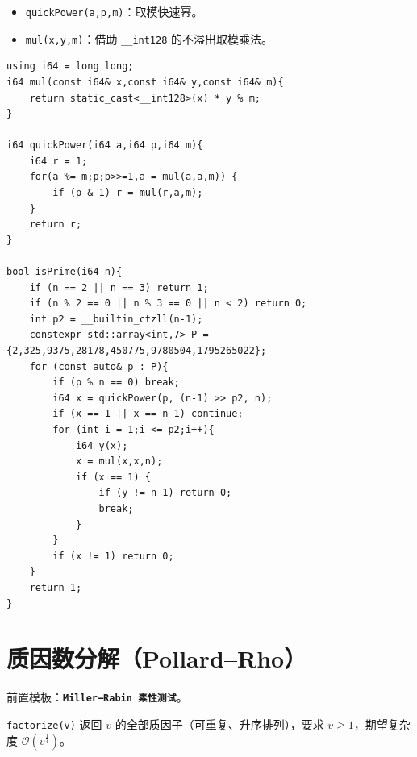 \begin{itemize}
    \item \verb|quickPower(a,p,m)|：取模快速幂。
    \item \verb|mul(x,y,m)|：借助 \texttt{\_\_int128} 的不溢出取模乘法。
\end{itemize}

\begin{lstlisting}
using i64 = long long;
i64 mul(const i64& x,const i64& y,const i64& m){
    return static_cast<__int128>(x) * y % m;
}

i64 quickPower(i64 a,i64 p,i64 m){
    i64 r = 1;
    for(a %= m;p;p>>=1,a = mul(a,a,m)) {
        if (p & 1) r = mul(r,a,m);
    }
    return r;
}

bool isPrime(i64 n){
    if (n == 2 || n == 3) return 1;
    if (n % 2 == 0 || n % 3 == 0 || n < 2) return 0;
    int p2 = __builtin_ctzll(n-1);
    constexpr std::array<int,7> P = {2,325,9375,28178,450775,9780504,1795265022};
    for (const auto& p : P){
        if (p % n == 0) break;
        i64 x = quickPower(p, (n-1) >> p2, n);
        if (x == 1 || x == n-1) continue;
        for (int i = 1;i <= p2;i++){
            i64 y(x);
            x = mul(x,x,n);
            if (x == 1) {
                if (y != n-1) return 0;
                break;
            }
        }
        if (x != 1) return 0;
    }
    return 1;
}
\end{lstlisting}

\section{质因数分解（Pollard--Rho）}

前置模板：\textbf{\texttt{Miller--Rabin 素性测试}}。

\verb|factorize(v)| 返回 $v$ 的全部质因子（可重复、升序排列），要求 $v\ge 1$，期望复杂度 $\mathcal{O}(v^{\frac14})$。

